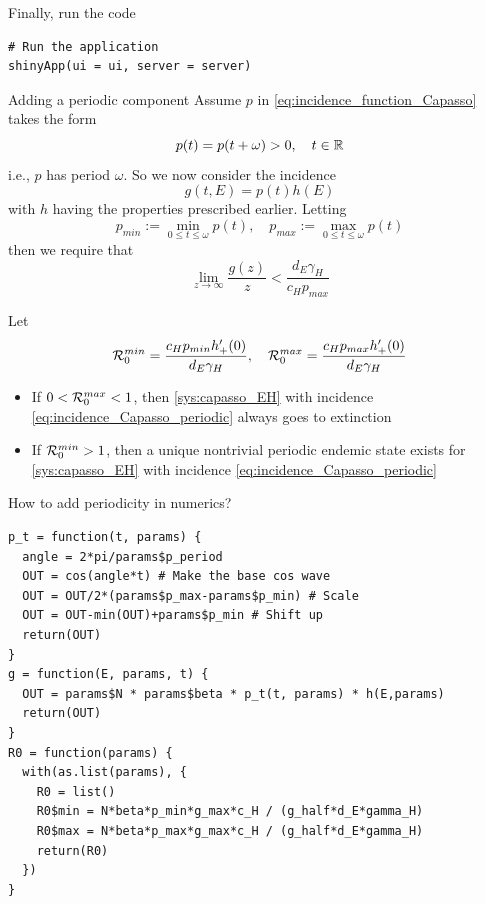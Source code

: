 \documentclass[aspectratio=169]{beamer}
\begin{document}
\begin{frame}[fragile]{Finally, run the code}
\begin{lstlisting}
# Run the application 
shinyApp(ui = ui, server = server)
\end{lstlisting}
\end{frame}
  

\begin{frame}{Adding a periodic component}
  Assume $p$ in \eqref{eq:incidence_function_Capasso} takes the form 
  \begin{equation}
    p(t)=p(t+\omega)>0,\quad t\in\mathbb{R}
  \end{equation}
  i.e., $p$ has period $\omega$. So we now consider the incidence
  \begin{equation}
    \label{eq:incidence_Capasso_periodic}
    g(t,E)=p(t)h(E)
  \end{equation}
  with $h$ having the properties prescribed earlier.
  Letting 
  \begin{equation}
    p_{min} := \min_{0\leq t\leq\omega}p(t),\quad
    p_{max} := \max_{0\leq t\leq\omega}p(t)
  \end{equation}
  then we require that 
  \begin{equation}
    \lim_{z\to\infty}\frac{g(z)}{z}<\frac{d_E\gamma_H}{c_Hp_{max}}
  \end{equation}
\end{frame}


\begin{frame}
  Let
  \begin{equation}
    \label{eq:R0_capasso_periodic}
    \mathcal{R}_0^{min} = \frac{c_Hp_{min}h'_+(0)}{d_E\gamma_H},\quad 
    \mathcal{R}_0^{max} = \frac{c_Hp_{max}h'_+(0)}{d_E\gamma_H}
  \end{equation}
  \begin{theorem}
    \begin{itemize}
      \item If $0<\mathcal{R}_0^{max}<1$, then \eqref{sys:capasso_EH} with incidence \eqref{eq:incidence_Capasso_periodic} always goes to extinction
      \item If $\mathcal{R}_0^{min}>1$, then a unique nontrivial periodic endemic state exists for \eqref{sys:capasso_EH} with incidence \eqref{eq:incidence_Capasso_periodic}
    \end{itemize}
  \end{theorem}
\end{frame}

\begin{frame}[fragile]{How to add periodicity in numerics?}
\begin{lstlisting}
p_t = function(t, params) {
  angle = 2*pi/params$p_period
  OUT = cos(angle*t) # Make the base cos wave
  OUT = OUT/2*(params$p_max-params$p_min) # Scale
  OUT = OUT-min(OUT)+params$p_min # Shift up
  return(OUT)
}   
g = function(E, params, t) {
  OUT = params$N * params$beta * p_t(t, params) * h(E,params)
  return(OUT)
}
R0 = function(params) {
  with(as.list(params), {
    R0 = list()
    R0$min = N*beta*p_min*g_max*c_H / (g_half*d_E*gamma_H)
    R0$max = N*beta*p_max*g_max*c_H / (g_half*d_E*gamma_H)
    return(R0)
  })
}  
\end{lstlisting}
\end{frame}
\end{document}
